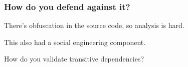 \begin{frame}
\frametitle{How do you defend against it?}

There's obfuscation in the source code, so analysis is hard.

This also had a social engineering component.

How do you validate transitive dependencies?

\end{frame}




